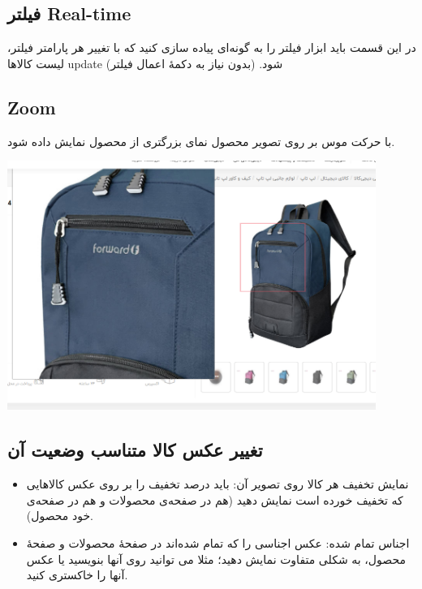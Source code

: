 \documentclass[]{article}
\begin{document}
\newpage


\subsection*{{\titr فیلتر Real-time   }}

در این قسمت باید ابزار فیلتر را به گونه‌ای پیاده سازی کنید که با تغییر هر پارامتر فیلتر، لیست کالاها update شود. (بدون نیاز به دکمهٔ اعمال فیلتر)


\subsection*{{\titr Zoom   }}

 با حرکت موس بر روی تصویر محصول نمای بزرگتری از محصول نمایش داده شود.
 
 
 
 \begin{center}
\includegraphics[width=0.9\textwidth]{images/image33.png}
\end{center}
 
 
 
\subsection*{{\titr تغییر عکس کالا متناسب وضعیت آن   }}


\begin{itemize}

\item

نمایش تخفیف هر کالا روی تصویر آن: باید درصد تخفیف را بر روی عکس کالاهایی که تخفیف خورده است نمایش دهید (هم در صفحه‌ی محصولات و هم در صفحه‌ی خود محصول).

\item

اجناس تمام شده: عکس اجناسی را که تمام شده‌اند در صفحهٔ محصولات و صفحهٔ محصول، به شکلی متفاوت نمایش دهید؛ مثلا می توانید روی آنها   بنویسید یا عکس آنها را خاکستری کنید.


\end{itemize}
\end{document}
